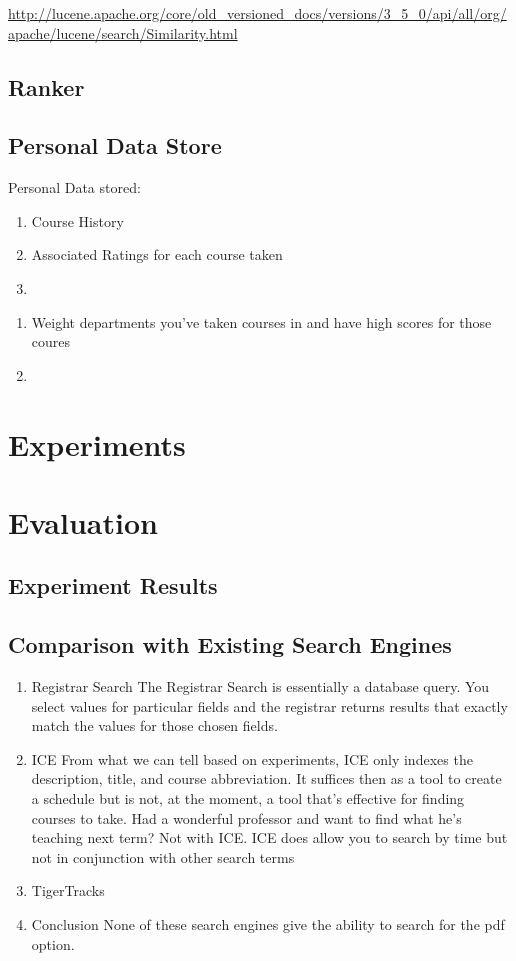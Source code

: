 \documentclass[12pt,letterpaper]{article}
\begin{document}
\url{http://lucene.apache.org/core/old_versioned_docs/versions/3_5_0/api/all/org/apache/lucene/search/Similarity.html}
		
\subsection{Ranker}
\subsection{Personal Data Store}
Personal Data stored:
\begin{enumerate}
\item Course History
\item Associated Ratings for each course taken
\item 
\end{enumerate}

\begin{enumerate}
\item Weight departments you've taken courses in and have high scores for those coures
\item 
\end{enumerate}
\section{Experiments}

\section{Evaluation}
\subsection{Experiment Results}
\subsection{Comparison with Existing Search Engines}
\begin{enumerate}
\item Registrar Search
  The Registrar Search is essentially a database query. You select values for particular fields and the registrar returns results that exactly match the values for those chosen fields.
  
\item ICE
  From what we can tell based on experiments, ICE only indexes the description, title, and course abbreviation. It suffices then as a tool to create a schedule but is not, at the moment, a tool that's effective for finding courses to take. Had a wonderful professor and want to find what he's teaching next term? Not with ICE. ICE does allow you to search by time but not in conjunction with other search terms 
  
\item TigerTracks
  
\item Conclusion
  None of these search engines give the ability to search for the pdf option. 
\end{enumerate}
\end{document}
